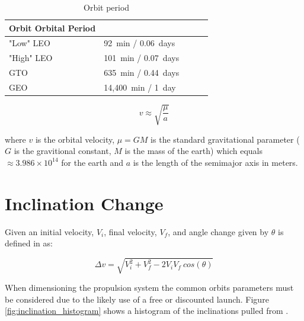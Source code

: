 \documentclass[a4paper, article, oneside, UKenglish]{memoir}
\newcommand{\0}{\mathbf{0}}
\newcommand{\1}{\mathbf{1}}
\begin{document}
\begin{table}[h]
\centering
\begin{tabular}{@{}lllll@{}}
\toprule
Orbit 		Orbital Period 			\\ \midrule
"Low" LEO   & 92~min / 0.06~days    \\
"High" LEO	& 101~min / 0.07~days   \\
GTO      	& 635~min / 0.44~days   \\
GEO      	& 14,400~min / 1~day	\\ \bottomrule
\end{tabular}
\captionsetup{justification=centering}
\caption{Orbit period}
\label{tab:orbital_periods}
\end{table}

\begin{equation}
v \approx \sqrt{ \frac{ \mu }{a} }
\label{equ:velocity_sma}
\end{equation}


where $ v $ is the orbital velocity, $ \mu = G M $ is the standard gravitational parameter ($G$ is the gravitional constant, $M$ is the mass of the earth) which equals $ \approx 3.986 \times 10^{14} $ for the earth and $ a $ is the length of the semimajor axis in meters.

\section{Inclination Change}

Given an initial velocity, $ V_i $, final velocity, $ V_f $, and angle change given by $ \theta $ is defined in \cite{orbitalmechanics_website} as:

\begin{equation}
\Delta v = \sqrt{ V_i^2 + V_f^2 - 2 V_i V_f ~ cos( \theta ) }
\label{equ:deltav_inclination_change}
\end{equation}


When dimensioning the propulsion system the common orbits parameters must be considered due to the likely use of a free or discounted launch.  Figure \ref{fig:inclination_histogram} shows a histogram of the inclinations pulled from \cite{ucsusa_database}.
\end{document}
